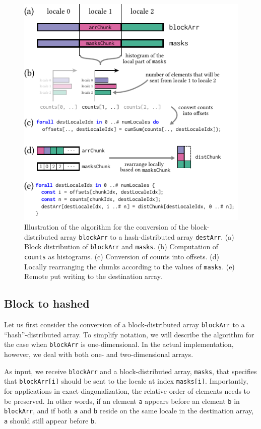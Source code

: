 \begin{figure}[h]
    \centering
    \includegraphics[width=0.7\linewidth]{./chapters/Proceedings_PAW_ATM_2023/algo-arrFromBlockToHashed.pdf}
    \cprotect\caption{Illustration of the algorithm for the conversion of the block-distributed array \verb|blockArr| to a hash-distributed array \verb|destArr|.
    (a) Block distribution of \verb|blockArr| and \verb|masks|.
    (b) Computation of \verb|counts| as histograms.
    (c) Conversion of counts into offsets.
    (d) Locally rearranging the chunks according to the values of \verb|masks|.
    (e) Remote put writing to the destination array.}
    \label{fig:ls23:algo:arrFromBlockToHashed}
\end{figure}


\subsection{Block to hashed}

Let us first consider the conversion of a block-distributed array \verb|blockArr| to a ``hash''-distributed array. To simplify notation, we will describe the algorithm for the case when \verb|blockArr| is one-dimensional. In the actual implementation, however, we deal with both one- and two-dimensional arrays.

As input, we receive \verb|blockArr| and a block-distributed array, \verb|masks|, that specifies that \verb|blockArr[i]| should be sent to the locale at index \verb|masks[i]|. Importantly, for applications in exact diagonalization, the relative order of elements needs to be preserved. In other words, if an element \verb|a| appears before an element \verb|b| in \verb|blockArr|, and if both \verb|a| and \verb|b| reside on the same locale in the destination array, \verb|a| should still appear before \verb|b|.

